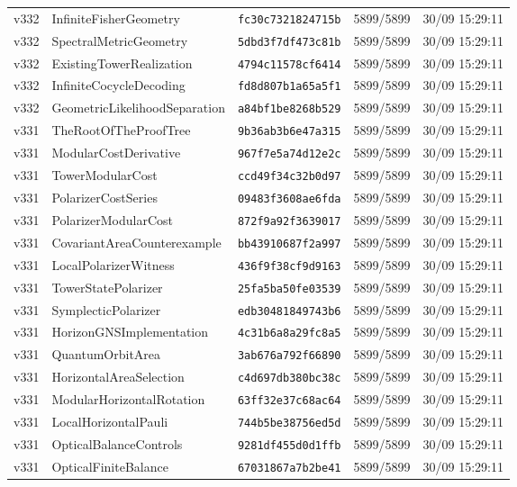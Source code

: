 \documentclass[11pt]{article}
\theoremstyle{definition}\newtheorem{deriv}{Derivação}
\begin{document}
{\begin{longtable}{@{}lllll@{}}
v332 & InfiniteFisherGeometry & \texttt{fc30c7321824715b} & 5899/5899 & 30/09 15:29:11 \\
v332 & SpectralMetricGeometry & \texttt{5dbd3f7df473c81b} & 5899/5899 & 30/09 15:29:11 \\
v332 & ExistingTowerRealization & \texttt{4794c11578cf6414} & 5899/5899 & 30/09 15:29:11 \\
v332 & InfiniteCocycleDecoding & \texttt{fd8d807b1a65a5f1} & 5899/5899 & 30/09 15:29:11 \\
v332 & GeometricLikelihoodSeparation & \texttt{a84bf1be8268b529} & 5899/5899 & 30/09 15:29:11 \\
v331 & TheRootOfTheProofTree & \texttt{9b36ab3b6e47a315} & 5899/5899 & 30/09 15:29:11 \\
v331 & ModularCostDerivative & \texttt{967f7e5a74d12e2c} & 5899/5899 & 30/09 15:29:11 \\
v331 & TowerModularCost & \texttt{ccd49f34c32b0d97} & 5899/5899 & 30/09 15:29:11 \\
v331 & PolarizerCostSeries & \texttt{09483f3608ae6fda} & 5899/5899 & 30/09 15:29:11 \\
v331 & PolarizerModularCost & \texttt{872f9a92f3639017} & 5899/5899 & 30/09 15:29:11 \\
v331 & CovariantAreaCounterexample & \texttt{bb43910687f2a997} & 5899/5899 & 30/09 15:29:11 \\
v331 & LocalPolarizerWitness & \texttt{436f9f38cf9d9163} & 5899/5899 & 30/09 15:29:11 \\
v331 & TowerStatePolarizer & \texttt{25fa5ba50fe03539} & 5899/5899 & 30/09 15:29:11 \\
v331 & SymplecticPolarizer & \texttt{edb30481849743b6} & 5899/5899 & 30/09 15:29:11 \\
v331 & HorizonGNSImplementation & \texttt{4c31b6a8a29fc8a5} & 5899/5899 & 30/09 15:29:11 \\
v331 & QuantumOrbitArea & \texttt{3ab676a792f66890} & 5899/5899 & 30/09 15:29:11 \\
v331 & HorizontalAreaSelection & \texttt{c4d697db380bc38c} & 5899/5899 & 30/09 15:29:11 \\
v331 & ModularHorizontalRotation & \texttt{63ff32e37c68ac64} & 5899/5899 & 30/09 15:29:11 \\
v331 & LocalHorizontalPauli & \texttt{744b5be38756ed5d} & 5899/5899 & 30/09 15:29:11 \\
v331 & OpticalBalanceControls & \texttt{9281df455d0d1ffb} & 5899/5899 & 30/09 15:29:11 \\
v331 & OpticalFiniteBalance & \texttt{67031867a7b2be41} & 5899/5899 & 30/09 15:29:11 \\

\end{longtable}}
\end{document}
